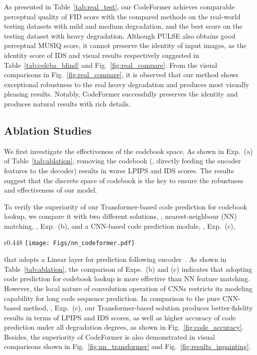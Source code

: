 As presented in Table~\ref{tab:real_test}, our CodeFormer  achieves comparable perceptual quality of FID score with the compared methods on the real-world testing datasets with mild and medium degradation, and the best score on the testing dataset with heavy degradation.  Although PULSE \cite{menon2020pulse} also obtains good perceptual MUSIQ score, it cannot preserve the identity of input images, as the identity score of IDS and visual results respectively suggested in  Table~\ref{tab:celeba_blind} and  Fig.~\ref{fig:real_compare}.
From the visual comparisons in Fig.~\ref{fig:real_compare}, it is observed that our method shows exceptional robustness to the real heavy degradation and produces most visually pleasing results. Notably, CodeFormer successfully preserves the identity and produces natural results with rich details. 


\subsection{Ablation Studies}


We first investigate the effectiveness of the codebook space. As shown in Exp.~(a) of Table~\ref{tab:ablation}, removing the codebook (\ie, directly feeding the encoder features  to the decoder) results in worse LPIPS and IDS scores. The results suggest that the discrete space of codebook is the key to ensure the robustness and effectiveness of our model.


To verify the superiority of our Transformer-based code prediction for codebook lookup, we compare it with two different solutions, \ie, nearest-neighbour (NN) matching, \ie, Exp.~(b), and a CNN-based code prediction module, \ie, Exp.~(c),
\begin{wrapfigure}{r}{0.448\textwidth}
	\vspace{-9pt}
	\centering
	\texttt{[image: Figs/nn\_codeformer.pdf]}
	\vspace{-16pt}
	\caption{\small{
			Qualitative comparisons of different codebook lookup methods.
	}}\label{fig:nn_transformer}
	\vspace{-15pt}
\end{wrapfigure}
that adopts a Linear layer for prediction following encoder~.
As shown in Table~\ref{tab:ablation}, the comparison of Exps.~(b) and (c) indicates that adopting code prediction for codebook lookup is more effective than NN feature matching.
However, the local nature of convolution operation of CNNs restricts its modeling capability for long code sequence prediction. In comparison to the pure CNN-based method, \ie, Exp.~(c), our Transformer-based solution produces better-fidelity results in terms of LPIPS and IDS scores, as well as higher accuracy of code prediction under all degradation degrees, as shown in Fig.~\ref{fig:code_accuracy}. Besides, the superiority of CodeFormer is also demonstrated in visual comparisons shown in Fig.~\ref{fig:nn_transformer} and Fig.~\ref{fig:results_inpainting}.


